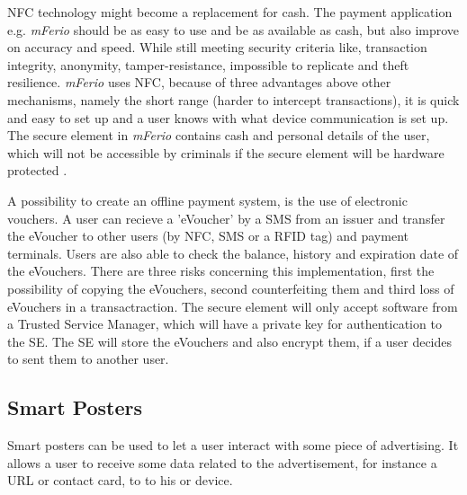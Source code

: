 
NFC technology might become a replacement for cash. The payment application e.g. \textit{mFerio} should be as easy to use and be as available as cash, but also improve on accuracy and speed. While still meeting security criteria like, transaction integrity, anonymity, tamper-resistance, impossible to replicate and theft resilience. 
\textit{mFerio} uses NFC, because of three advantages above other mechanisms, namely the short range (harder to intercept transactions), it is quick and easy to set up and a user knows with what device communication is set up. The secure element in \textit{mFerio} contains cash and personal details of the user, which will not be accessible by criminals if the secure element will be hardware protected \cite{1555846}.

A possibility to create an offline payment system, is the use of electronic vouchers. A user can recieve a 'eVoucher' by a SMS from an issuer and transfer the eVoucher to other users (by NFC, SMS or a RFID tag) and payment terminals. Users are also able to check the balance, history and expiration date of the eVouchers. 
There are three risks concerning this implementation, first the possibility of copying the eVouchers, second counterfeiting them and third loss of eVouchers in a transactraction. The secure element will only accept software from a Trusted Service Manager, which will have a private key for authentication to the SE. The SE will store the eVouchers and also encrypt them, if a user decides to sent them to another user. \cite{1592613}


\subsection{Smart Posters}
Smart posters can be used to let a user interact with some piece of advertising.
It allows a user to receive some data related to the advertisement, for instance a URL or contact card, to to his or device.



